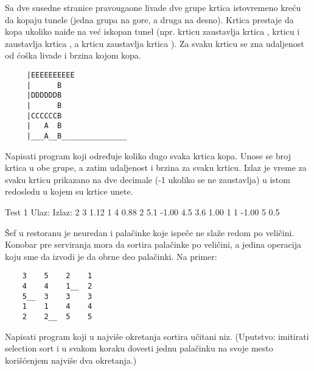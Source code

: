 \begin{Exercise}[label=511]
  Sa dve susedne stranice pravougaone livade dve grupe krtica
  istovremeno kreću da kopaju tunele (jedna grupa na gore, a druga na
  desno). Krtica prestaje da kopa ukoliko naiđe na već iskopan tunel
  (npr. krticu  zaustavlja krtica , krticu  i
   zaustavlja krtica , a krticu  zaustavlja
  krtica ). Za svaku krticu se zna udaljenost od ćoška livade
  i brzina kojom kopa.
\begin{verbatim}
     |EEEEEEEEEE
     |      B
     |DDDDDDB 
     |      B
     |CCCCCCB
     |   A  B
     |___A__B_______________
\end{verbatim}
Napisati program koji određuje koliko dugo svaka krtica kopa. Unose
se broj krtica u obe grupe, a zatim udaljenost i brzina za svaku
krticu. Izlaz je vreme za svaku krticu prikazano na dve decimale (-1
ukoliko se ne zaustavlja) u istom redosledu u kojem su krtice unete.

\begin{miditest}
\begin{test}{Test 1}
Ulaz:          Izlaz:
2 3            1.12
1   4          0.88
2   5.1        -1.00
4.5 3.6        1.00
1   1          -1.00
5   0.5
\end{test}
\end{miditest}
  
\end{Exercise}

\begin{Exercise}[label=512]
  Šef u restoranu je neuredan i palačinke koje ispeče ne slaže redom
  po veličini. Konobar pre serviranja mora da sortira palačinke po
  veličini, a jedina operacija koju sme da izvodi je da obrne deo
  palačinki. Na primer:
\begin{verbatim}
    3    5    2    1
    4    4    1__  2
    5__  3    3    3
    1    1    4    4
    2    2__  5    5
\end{verbatim}
Napisati program koji u najviše  okretanja sortira učitani
niz. (Uputstvo: imitirati selection sort i u svakom koraku dovesti
jednu palačinku na svoje mesto korišćenjem najviše dva okretanja.)
    
\end{Exercise}

